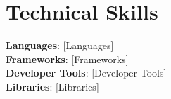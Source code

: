 \section{Technical Skills}
\begin{itemize}[leftmargin=0.15in, label={}]
  \small{\item{
    \textbf{Languages}{: [Languages]} \\
    \textbf{Frameworks}{: [Frameworks]} \\
    \textbf{Developer Tools}{: [Developer Tools]} \\
    \textbf{Libraries}{: [Libraries]}
  }}
\end{itemize}
